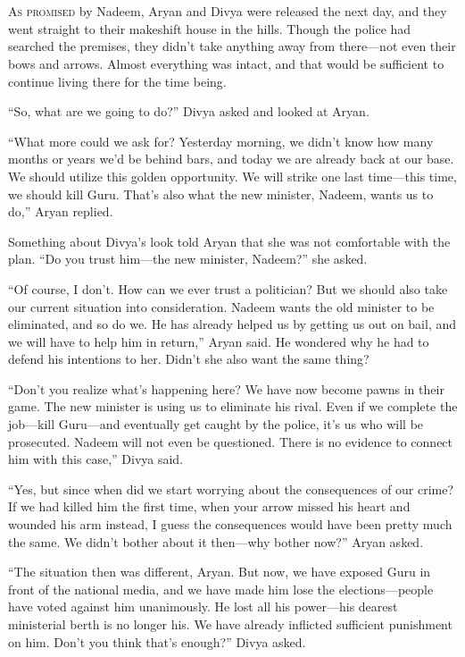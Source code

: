 \chapter{}

\lettrine{A}{s promised} by Nadeem, Aryan and Divya were released the next day,
and they went straight to their makeshift house in the hills. Though the police
had searched the premises, they didn't take anything away from there—not even
their bows and arrows. Almost everything was intact, and that would be sufficient
to continue living there for the time being.

“So, what are we going to do?” Divya asked and looked at Aryan.

“What more could we ask for? Yesterday morning, we didn't know how many months or
years we'd be behind bars, and today we are already back at our base. We
should utilize this golden opportunity. We will strike one last time—this time,
we should kill Guru. That's also what the new minister, Nadeem, wants us to do,”
Aryan replied.

Something about Divya's look told Aryan that she was not comfortable with the
plan. “Do you trust him—the new minister, Nadeem?” she asked.

“Of course, I don't. How can we ever trust a politician? But we should also take
our current situation into consideration. Nadeem wants the old minister to be
eliminated, and so do we. He has already helped us by getting us out on bail, and we
will have to help him in return,” Aryan said. He wondered why he had to defend his
intentions to her. Didn't she also want the same thing?

“Don't you realize what's happening here? We have now become pawns in their
game. The new minister is using us to eliminate his rival. Even if we complete
the job—kill Guru—and eventually get caught by the police, it's us who will
be prosecuted. Nadeem will not even be questioned. There is no evidence to
connect him with this case,” Divya said.

“Yes, but since when did we start worrying about the consequences of our crime?
If we had killed him the first time, when your arrow missed his heart and
wounded his arm instead, I guess the consequences would have been pretty much
the same. We didn't bother about it then—why bother now?” Aryan asked.

“The situation then was different, Aryan. But now, we have exposed Guru in front
of the national media, and we have made him lose the elections—people have voted
against him unanimously. He lost all his power—his dearest ministerial berth
is no longer his. We have already inflicted sufficient punishment on him. Don't
you think that's enough?” Divya asked.

